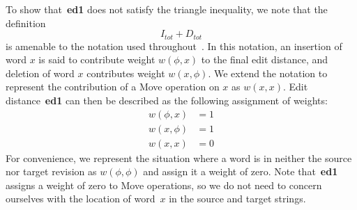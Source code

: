 To show that~\textbf{ed1} does not satisfy the triangle inequality, we
note that the definition
    \begin{equation*}
    I_{tot} + D_{tot}
    \end{equation*}
is amenable to the  notation used
throughout~\cite{Sankoff1999}.
In this notation, an insertion of word $x$ is said to
contribute weight $w(\phi, x)$ to the final edit distance, and
deletion of word $x$ contributes weight $w(x, \phi)$.
We extend the notation to represent the contribution of a
Move operation on $x$ as $w(x, x)$.
Edit distance~\textbf{ed1} can then be described as the following
assignment of weights:
\begin{align*}
  w(\phi, x) &= 1 \\
  w(x, \phi) &= 1 \\
  w(x, x) &= 0
\end{align*}
For convenience, we represent the situation where a word is in
neither the source nor target revision as $w(\phi, \phi)$ and
assign it a weight of zero.
Note that~\textbf{ed1} assigns a weight of zero to Move operations,
so we do not need to concern ourselves with the location of word~$x$
in the source and target strings.

